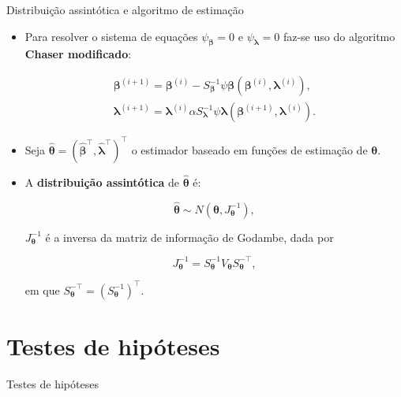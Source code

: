 \documentclass[
  ignorenonframetext,
  serif,
  professionalfont,
  usenames,
  dvipsnames,
  aspectratio = 169]{beamer}
\begin{document}
\begin{frame}{Distribuição assintótica e algoritmo de estimação}
\protect\hypertarget{distribuiuxe7uxe3o-assintuxf3tica-e-algoritmo-de-estimauxe7uxe3o}{}
\begin{itemize}

  \item Para resolver o sistema de equações $\psi_{\boldsymbol{\beta}} = 0$ e $\psi_{\boldsymbol{\lambda}} = 0$ faz-se uso do algoritmo \textbf{Chaser modificado}:

$$
\begin{matrix}
\boldsymbol{\beta}^{(i+1)} = \boldsymbol{\beta}^{(i)}- S_{\boldsymbol{\beta}}^{-1} \psi \boldsymbol{\beta} (\boldsymbol{\beta}^{(i)}, \boldsymbol{\lambda}^{(i)}), \\ 
\boldsymbol{\lambda}^{(i+1)} = \boldsymbol{\lambda}^{(i)}\alpha S_{\boldsymbol{\lambda}}^{-1} \psi \boldsymbol{\lambda} (\boldsymbol{\beta}^{(i+1)}, \boldsymbol{\lambda}^{(i)}).
\end{matrix}
$$

  \item Seja $\boldsymbol{\hat{\theta}} = (\boldsymbol{\hat{\beta}^{\top}}, \boldsymbol{\hat{\lambda}^{\top}})^{\top}$ o estimador baseado em funções de estimação de $\boldsymbol{\theta}$.
  
  \item A \textbf{distribuição assintótica} de $\boldsymbol{\hat{\theta}}$ é:

$$
\boldsymbol{\hat{\theta}} \sim N(\boldsymbol{\theta}, J_{\boldsymbol{\theta}}^{-1}),
$$

\noindent $J_{\boldsymbol{\theta}}^{-1}$ é a inversa da matriz de informação de Godambe, dada por
  
$$J_{\boldsymbol{\theta}}^{-1} = S_{\boldsymbol{\theta}}^{-1} V_{\boldsymbol{\theta}} S_{\boldsymbol{\theta}}^{-\top},$$ 

\noindent em que $S_{\boldsymbol{\theta}}^{-\top} = (S_{\boldsymbol{\theta}}^{-1})^{\top}.$

\end{itemize}
\end{frame}

\hypertarget{testes-de-hipuxf3teses}{%
\section{Testes de hipóteses}\label{testes-de-hipuxf3teses}}

\begin{frame}{Testes de hipóteses}
\end{frame}
\end{document}

